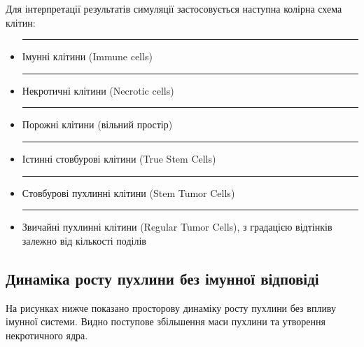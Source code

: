 \documentclass{article}
\begin{document}
Для інтерпретації результатів симуляції застосовується наступна колірна схема клітин:

\begin{itemize}
    \item \textcolor{blue}{\rule{1em}{1em}} Імунні клітини (Immune cells)
    \item \textcolor{orange}{\rule{1em}{1em}} Некротичні клітини (Necrotic cells)
    \item \textcolor{gray}{\rule{1em}{1em}} Порожні клітини (вільний простір)
    \item \textcolor{yellow}{\rule{1em}{1em}} Істинні стовбурові клітини (True Stem Cells)
    \item \textcolor{green}{\rule{1em}{1em}} Стовбурові пухлинні клітини (Stem Tumor Cells)
    \item \textcolor{red}{\rule{1em}{1em}} Звичайні пухлинні клітини (Regular Tumor Cells), з градацією відтінків залежно від кількості поділів
\end{itemize}

\subsection{Динаміка росту пухлини без імунної відповіді}
На рисунках нижче показано просторову динаміку росту пухлини без впливу імунної системи. Видно поступове збільшення маси пухлини та утворення некротичного ядра.
\end{document}

